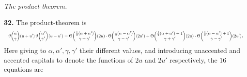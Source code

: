 \documentclass[11pt]{article}
\begin{document}
\medskip

\textit{The product-theorem.}

\medskip

\textbf{32.} The product-theorem is
\[
\resizebox{\textwidth}{!}{$\displaystyle \vartheta\!\begin{pmatrix} \alpha \\ \gamma \end{pmatrix}\!(u + u')\,\vartheta\!\begin{pmatrix} \alpha' \\ \gamma' \end{pmatrix}\!(u - u') = \Theta\!\begin{pmatrix} \tfrac{1}{2}(\alpha + \alpha') \\ \gamma + \gamma' \end{pmatrix}\!(2u)\cdot \Theta\!\begin{pmatrix} \tfrac{1}{2}(\alpha - \alpha') \\ \gamma - \gamma' \end{pmatrix}\!(2u') + \Theta\!\begin{pmatrix} \tfrac{1}{2}(\alpha + \alpha') + 1 \\ \gamma + \gamma' \end{pmatrix}\!(2u)\cdot \Theta\!\begin{pmatrix} \tfrac{1}{2}(\alpha - \alpha') + 1 \\ \gamma - \gamma' \end{pmatrix}\!(2u')$}.
\]
Here giving to $\alpha,\alpha',\gamma,\gamma'$ their different values, and introducing unaccented and accented capitals to denote the functions of $2u$ and $2u'$ respectively, the $16$ equations are

\medskip
\end{document}
